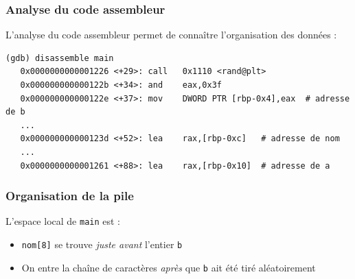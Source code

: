\documentclass{beamer}
\begin{document}
\begin{frame}[fragile]
\frametitle{Analyse du code assembleur}

L'analyse du code assembleur permet de connaître l'organisation des données :

\begin{lstlisting}[language={[x86masm]Assembler},basicstyle=\ttfamily\tiny]
(gdb) disassemble main
   0x0000000000001226 <+29>: call   0x1110 <rand@plt>
   0x000000000000122b <+34>: and    eax,0x3f
   0x000000000000122e <+37>: mov    DWORD PTR [rbp-0x4],eax  # adresse de b
   ...
   0x000000000000123d <+52>: lea    rax,[rbp-0xc]   # adresse de nom
   ...
   0x0000000000001261 <+88>: lea    rax,[rbp-0x10]  # adresse de a
\end{lstlisting}

\end{frame}


\begin{frame}[fragile]
\frametitle{Organisation de la pile}

L'espace local de \texttt{main} est :
\begin{center}
\end{center}

\begin{itemize}
\item \texttt{nom[8]} se trouve \emph{juste avant} l'entier \texttt{b}
\item On entre la chaîne de caractères \emph{après} que \texttt{b} ait été tiré aléatoirement
\end{itemize}

\end{frame}
\end{document}
